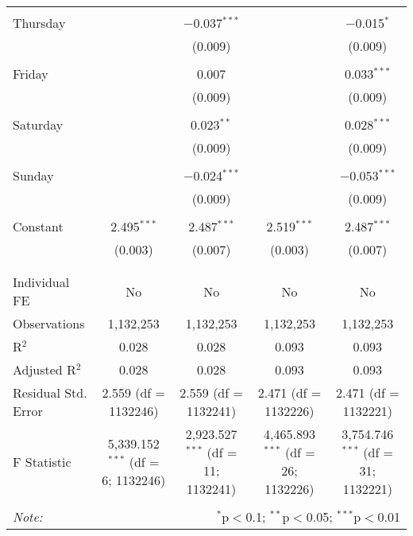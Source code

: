 \documentclass[
]{article}
\begin{document}
\begin{table}[!htbp]
{\begin{tabular}{@{\extracolsep{5pt}}lcccc}
  & & & & \\ 
 Thursday &  & $-$0.037$^{***}$ &  & $-$0.015$^{*}$ \\ 
  &  & (0.009) &  & (0.009) \\ 
  & & & & \\ 
 Friday &  & 0.007 &  & 0.033$^{***}$ \\ 
  &  & (0.009) &  & (0.009) \\ 
  & & & & \\ 
 Saturday &  & 0.023$^{**}$ &  & 0.028$^{***}$ \\ 
  &  & (0.009) &  & (0.009) \\ 
  & & & & \\ 
 Sunday &  & $-$0.024$^{***}$ &  & $-$0.053$^{***}$ \\ 
  &  & (0.009) &  & (0.009) \\ 
  & & & & \\ 
 Constant & 2.495$^{***}$ & 2.487$^{***}$ & 2.519$^{***}$ & 2.487$^{***}$ \\ 
  & (0.003) & (0.007) & (0.003) & (0.007) \\ 
  & & & & \\ 
\hline \\[-1.8ex] 
Individual FE & No & No & No & No \\ 
Observations & 1,132,253 & 1,132,253 & 1,132,253 & 1,132,253 \\ 
R$^{2}$ & 0.028 & 0.028 & 0.093 & 0.093 \\ 
Adjusted R$^{2}$ & 0.028 & 0.028 & 0.093 & 0.093 \\ 
Residual Std. Error & 2.559 (df = 1132246) & 2.559 (df = 1132241) & 2.471 (df = 1132226) & 2.471 (df = 1132221) \\ 
F Statistic & 5,339.152$^{***}$ (df = 6; 1132246) & 2,923.527$^{***}$ (df = 11; 1132241) & 4,465.893$^{***}$ (df = 26; 1132226) & 3,754.746$^{***}$ (df = 31; 1132221) \\ 
\hline 
\hline \\[-1.8ex] 
\textit{Note:}  & \multicolumn{4}{r}{$^{*}$p$<$0.1; $^{**}$p$<$0.05; $^{***}$p$<$0.01} \\ 
\end{tabular}
} 
\end{table} 
\newpage
\end{document}

